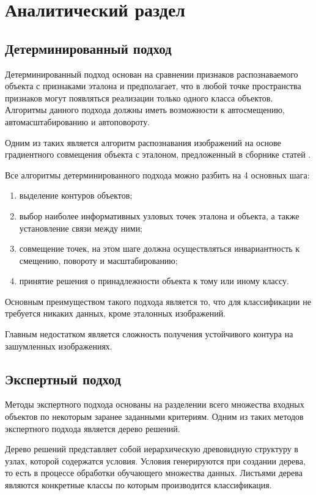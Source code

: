 \chapter{Аналитический раздел}

\section{Детерминированный подход}

Детерминированный подход основан на сравнении признаков распознаваемого объекта с признаками эталона и предполагает, что в любой точке пространства признаков могут появляться реализации только одного класса объектов. Алгоритмы данного подхода должны иметь возможности к автосмещению, автомасштабированию и автоповороту.

Одним из таких является алгоритм распознавания изображений на основе градиентного совмещения объекта с эталоном, предложенный в сборнике статей \cite{cyberlenin2}.

Все алгоритмы детерминированного подхода можно разбить на 4 основных шага:
\begin{enumerate}
	\item выделение контуров объектов;
	\item выбор наиболее информативных узловых точек эталона и объекта, а также установление связи между ними;
	\item совмещение точек, на этом шаге должна осуществляться инвариантность к смещению, повороту и масштабированию;
	\item принятие решения о принадлежности объекта к тому или иному классу.
\end{enumerate}

Основным преимуществом такого подхода является то, что для классификации не требуется никаких данных, кроме эталонных изображений.

Главным недостатком является сложность получения устойчивого контура на зашумленных изображениях.

\section{Экспертный подход}

Методы экспертного подхода основаны на разделении всего множества входных объектов по некоторым заранее заданными критериям. Одним из таких методов экспертного подхода является дерево решений.

Дерево решений представляет собой иерархическую древовидную структуру в узлах, которой содержатся условия. Условия генерируются при создании дерева, то есть в процессе обработки обучающего множества данных. Листьями дерева являются конкретные классы по которым производится классификация.

